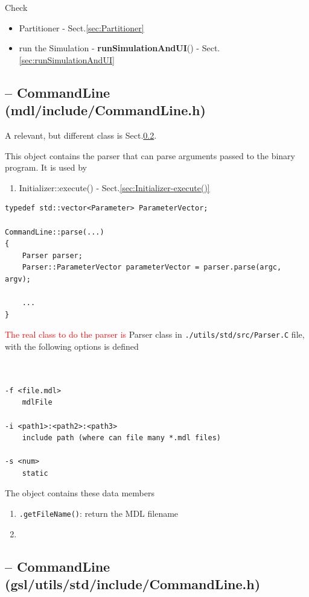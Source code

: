 Check
\begin{itemize}
  \item Partitioner - Sect.\ref{sec:Partitioner}
  
  \item run the Simulation - {\bf runSimulationAndUI}() -
  Sect.\ref{sec:runSimulationAndUI}
\end{itemize}



\subsection{-- CommandLine (mdl/include/CommandLine.h)}
\label{sec:CommandLine-MDL}


A relevant, but different class is Sect.\ref{sec:CommandLine-MGS}.

This object contains the parser that can parse arguments passed to the binary program. It is used by
\begin{enumerate}
  \item Initializer::execute() - Sect.\ref{sec:Initializer-execute()}
\end{enumerate}

\begin{verbatim}
typedef std::vector<Parameter> ParameterVector;

CommandLine::parse(...)
{
    Parser parser;
    Parser::ParameterVector parameterVector = parser.parse(argc, argv);
    
    ...
}
\end{verbatim}
\textcolor{red}{The real class to do the parser is} Parser class in 
\verb!./utils/std/src/Parser.C! file, with the following options is defined
\begin{verbatim}


-f <file.mdl>
	mdlFile
	
-i <path1>:<path2>:<path3>
	include path (where can file many *.mdl files)
	
-s <num>
	static
\end{verbatim}

The object contains these data members
\begin{enumerate}
  \item \verb!.getFileName()!: return the MDL filename
  
  
  \item 
\end{enumerate}


\subsection{-- CommandLine (gsl/utils/std/include/CommandLine.h)}
\label{sec:CommandLine-MGS}

